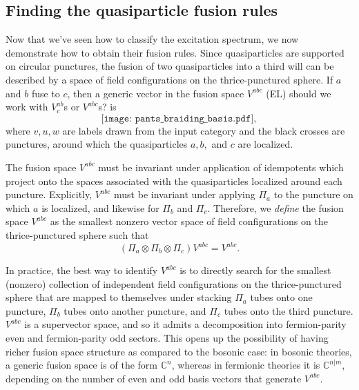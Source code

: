 \documentclass[12pt,a4paper]{article}
\newcommand{\tp}{\otimes}
\newcommand{\cc}{\mathbb{C}}
\newcommand\be            {\begin{equation}}
\newcommand\ee            {\end{equation}}
\newcommand{\fube}{\textbf{Tube}}
\newcommand{\fld}{\mathcal{F}} %
\newcommand{\ethan}[1]{{\color{amethyst}\footnotesize{(EL) #1}}}
\begin{document}

\subsection{Finding the quasiparticle fusion rules}

Now that we've seen how to classify the excitation spectrum, we now demonstrate how to obtain their fusion rules. Since quasiparticles are supported on circular punctures, the fusion of two quasiparticles into a third will can be described by a space of field configurations on the thrice-punctured sphere. If $a$ and $b$ fuse to $c$, then a generic vector in the fusion space $V^{abc}$ \ethan{should we work with $V^{ab}_c$s or $V^{abc}$s?} is 
\be \label{pants_braiding_basis} \texttt{[image: pants\_braiding\_basis.pdf]},\ee
where $v,u,w$ are labels drawn from the input category and the black crosses are punctures, around which the quasiparticles $a,b,$ and $c$ are localized. 

The fusion space $V^{abc}$ must be invariant under application of idempotents which project onto the spaces associated with the quasiparticles localized around each puncture. Explicitly, $V^{abc}$ must be invariant under applying $\Pi_a$ to the puncture on which $a$ is localized, and likewise for $\Pi_b$ and $\Pi_c$. 
Therefore, we {\it define} the fusion space $V^{abc}$ as the smallest nonzero vector space of field configurations on the thrice-punctured sphere such that 
\be (\Pi_a\tp \Pi_b \tp \Pi_c) V^{abc} = V^{abc}.\ee

In practice, the best way to identify $V^{abc}$ is to directly search for the smallest (nonzero) collection of independent field configurations on the thrice-punctured sphere that are mapped to themselves under stacking $\Pi_a$ tubes onto one puncture, $\Pi_b$ tubes onto another puncture, and $\Pi_c$ tubes onto the third puncture. $V^{abc}$ is a supervector space, and so it admits a decomposition into fermion-parity even and fermion-parity odd sectors. This opens up the possibility of having richer fusion space structure as compared to the bosonic case: in bosonic theories, a generic fusion space is of the form $\cc^n$, whereas in fermionic theories it is $\cc^{n|m}$, depending on the number of even and odd basis vectors that generate $V^{abc}$.
\end{document}
